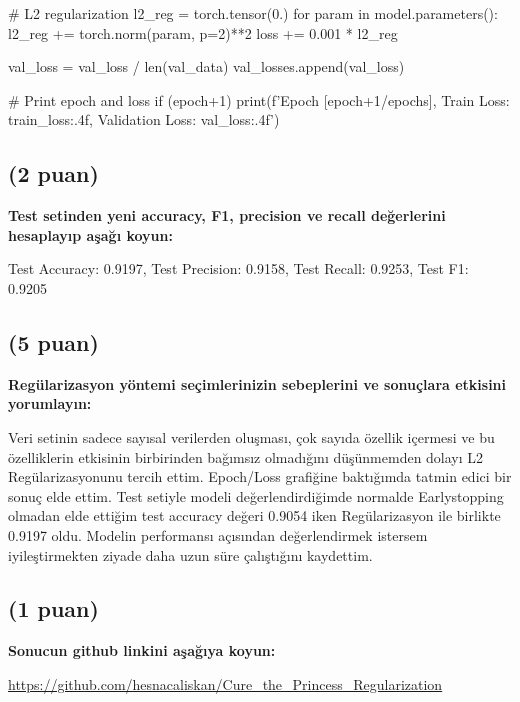 \documentclass[11pt]{article}
\begin{document}
\begin{python}
            # L2 regularization
            l2_reg = torch.tensor(0.)
            for param in model.parameters():
              l2_reg += torch.norm(param, p=2)**2
        loss += 0.001 * l2_reg
        
        val_loss = val_loss / len(val_data)
        val_losses.append(val_loss)

  # Print epoch and loss
    if (epoch+1) %
        print(f'Epoch [{epoch+1}/{epochs}], Train Loss: {train_loss:.4f}, Validation Loss: {val_loss:.4f}')
\end{python}

\subsection{(2 puan)} \textbf{Test setinden yeni accuracy, F1, precision ve recall değerlerini hesaplayıp aşağı koyun:}

Test Accuracy: 0.9197, Test Precision: 0.9158, Test Recall: 0.9253, Test F1: 0.9205


\subsection{(5 puan)} \textbf{Regülarizasyon yöntemi seçimlerinizin sebeplerini ve sonuçlara etkisini yorumlayın:}

Veri setinin sadece sayısal verilerden oluşması, çok sayıda özellik içermesi  ve bu özelliklerin etkisinin birbirinden bağımsız olmadığını düşünmemden dolayı L2 Regülarizasyonunu tercih ettim. Epoch/Loss grafiğine baktığımda tatmin edici bir sonuç elde ettim. Test setiyle modeli değerlendirdiğimde normalde Earlystopping olmadan elde ettiğim test accuracy değeri 0.9054 iken Regülarizasyon ile birlikte 0.9197 oldu. Modelin performansı açısından değerlendirmek istersem iyileştirmekten ziyade daha uzun süre çalıştığını kaydettim.


\subsection{(1 puan)} \textbf{Sonucun github linkini  aşağıya koyun:}

\url{https://github.com/hesnacaliskan/Cure_the_Princess_Regularization}
\end{document}
